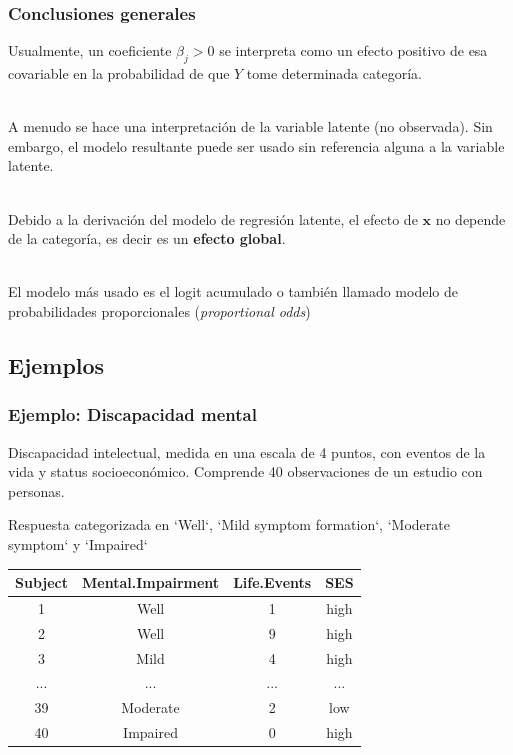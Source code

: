 \documentclass[]{beamer}
\begin{document}
\begin{frame}
	\frametitle{Conclusiones generales}
	Usualmente, un coeficiente $\beta_j>0$ se interpreta como un efecto positivo de esa covariable 
	en la probabilidad de que $Y$ tome determinada categoría.\\~\
	
	A menudo se hace una interpretación de la variable latente (no observada). Sin embargo, el modelo 
	resultante puede ser usado sin referencia alguna a la variable latente.\\~\  

	Debido a la derivación del modelo de regresión latente, el efecto de $\pmb{x}$ no depende de la 
	categoría, es decir es un \textbf{efecto global}.\\~\ 

	El modelo más usado es el logit acumulado o también llamado modelo de probabilidades 
	proporcionales (\textit{proportional odds})
\end{frame}

\subsection{Ejemplos}


\begin{frame}
	\frametitle{Ejemplo: Discapacidad mental}
	Discapacidad intelectual, medida en una escala de 4 puntos, con eventos de la vida y status socioeconómico. Comprende 40 observaciones de un estudio con personas.
	
	Respuesta categorizada en  `Well`, `Mild symptom formation`, `Moderate symptom` y `Impaired`
	
\begin{table}[ht]
\centering
\begin{tabular}{cccc}
  \hline
 Subject & Mental.Impairment & Life.Events & SES \\ 
  \hline
1 & Well &   1 & high \\ 
2 & Well &   9 & high \\ 
3 & Mild &   4 & high \\ 
... & ... &  ... &  ... \\
39 & Moderate &   2 & low \\ 
40 & Impaired &   0 & high \\ 
 
   \hline
\end{tabular}
\end{table}
\end{frame}
\end{document}
